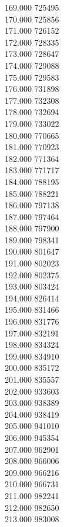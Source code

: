 { 169.000	725495 \\
 170.000	725856 \\
 171.000	726152 \\
 172.000	728335 \\
 173.000	728647 \\
 174.000	729088 \\
 175.000	729583 \\
 176.000	731898 \\
 177.000	732308 \\
 178.000	732694 \\
 179.000	733022 \\
 180.000	770665 \\
 181.000	770923 \\
 182.000	771364 \\
 183.000	771717 \\
 184.000	788195 \\
 185.000	788221 \\
 186.000	797138 \\
 187.000	797464 \\
 188.000	797900 \\
 189.000	798341 \\
 190.000	801647 \\
 191.000	802023 \\
 192.000	802375 \\
 193.000	803424 \\
 194.000	826414 \\
 195.000	831466 \\
 196.000	831776 \\
 197.000	832191 \\
 198.000	834324 \\
 199.000	834910 \\
 200.000	835172 \\
 201.000	835557 \\
 202.000	933603 \\
 203.000	938389 \\
 204.000	938419 \\
 205.000	941010 \\
 206.000	945354 \\
 207.000	962901 \\
 208.000	966006 \\
 209.000	966216 \\
 210.000	966731 \\
 211.000	982241 \\
 212.000	982650 \\
 213.000	983008 \\
}

